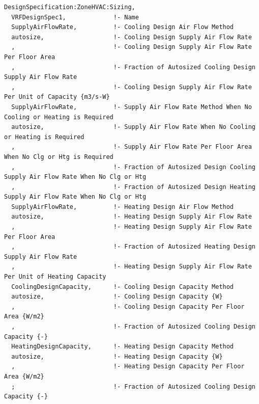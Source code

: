 \begin{lstlisting}
DesignSpecification:ZoneHVAC:Sizing,
  VRFDesignSpec1,             !- Name
  SupplyAirFlowRate,          !- Cooling Design Air Flow Method
  autosize,                   !- Cooling Design Supply Air Flow Rate
  ,                           !- Cooling Design Supply Air Flow Rate Per Floor Area
  ,                           !- Fraction of Autosized Cooling Design Supply Air Flow Rate
  ,                           !- Cooling Design Supply Air Flow Rate Per Unit of Capacity {m3/s-W}
  SupplyAirFlowRate,          !- Supply Air Flow Rate Method When No Cooling or Heating is Required
  autosize,                   !- Supply Air Flow Rate When No Cooling or Heating is Required
  ,                           !- Supply Air Flow Rate Per Floor Area When No Clg or Htg is Required
  ,                           !- Fraction of Autosized Design Cooling Supply Air Flow Rate When No Clg or Htg
  ,                           !- Fraction of Autosized Design Heating Supply Air Flow Rate When No Clg or Htg
  SupplyAirFlowRate,          !- Heating Design Air Flow Method
  autosize,                   !- Heating Design Supply Air Flow Rate
  ,                           !- Heating Design Supply Air Flow Rate Per Floor Area
  ,                           !- Fraction of Autosized Heating Design Supply Air Flow Rate
  ,                           !- Heating Design Supply Air Flow Rate Per Unit of Heating Capacity
  CoolingDesignCapacity,      !- Cooling Design Capacity Method
  autosize,                   !- Cooling Design Capacity {W}
  ,                           !- Cooling Design Capacity Per Floor Area {W/m2}
  ,                           !- Fraction of Autosized Cooling Design Capacity {-}
  HeatingDesignCapacity,      !- Heating Design Capacity Method
  autosize,                   !- Heating Design Capacity {W}
  ,                           !- Heating Design Capacity Per Floor Area {W/m2}
  ;                           !- Fraction of Autosized Cooling Design Capacity {-}


\end{lstlisting}
